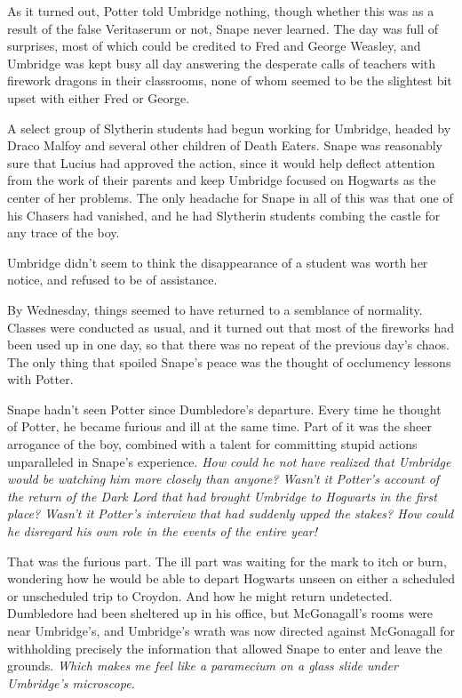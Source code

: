 \documentclass[a4paper,11pt]{article}
\begin{document}
As it turned out, Potter told Umbridge nothing, though whether this was as a result of the false Veritaserum or not, Snape never learned. The day was full of surprises, most of which could be credited to Fred and George Weasley, and Umbridge was kept busy all day answering the desperate calls of teachers with firework dragons in their classrooms, none of whom seemed to be the slightest bit upset with either Fred or George.

A select group of Slytherin students had begun working for Umbridge, headed by Draco Malfoy and several other children of Death Eaters. Snape was reasonably sure that Lucius had approved the action, since it would help deflect attention from the work of their parents and keep Umbridge focused on Hogwarts as the center of her problems. The only headache for Snape in all of this was that one of his Chasers had vanished, and he had Slytherin students combing the castle for any trace of the boy.

Umbridge didn't seem to think the disappearance of a student was worth her notice, and refused to be of assistance.

By Wednesday, things seemed to have returned to a semblance of normality. Classes were conducted as usual, and it turned out that most of the fireworks had been used up in one day, so that there was no repeat of the previous day's chaos. The only thing that spoiled Snape's peace was the thought of occlumency lessons with Potter.

Snape hadn't seen Potter since Dumbledore's departure. Every time he thought of Potter, he became furious and ill at the same time. Part of it was the sheer arrogance of the boy, combined with a talent for committing stupid actions unparalleled in Snape's experience. \emph{How could he not have realized that Umbridge would be watching him more closely than anyone? Wasn't it Potter's account of the return of the Dark Lord that had brought Umbridge to Hogwarts in the first place? Wasn't it Potter's interview that had suddenly upped the stakes? How could he disregard his own role in the events of the entire year!}

That was the furious part. The ill part was waiting for the mark to itch or burn, wondering how he would be able to depart Hogwarts unseen on either a scheduled or unscheduled trip to Croydon. And how he might return undetected. Dumbledore had been sheltered up in his office, but McGonagall's rooms were near Umbridge's, and Umbridge's wrath was now directed against McGonagall for withholding precisely the information that allowed Snape to enter and leave the grounds. \emph{Which makes me feel like a paramecium on a glass slide under Umbridge's microscope.}
\end{document}
